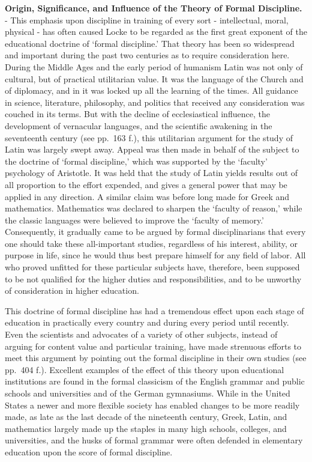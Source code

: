\documentclass[
]{book}
\begin{document}
\textbf{Origin, Significance, and Influence of the Theory of Formal Discipline.} - This emphasis upon discipline in training of every sort - intellectual, moral, physical - has often caused Locke to be regarded as the first great exponent of the educational doctrine of `formal discipline.' That theory has been so widespread and important during the past two centuries as to require consideration here. During the Middle Ages and the early period of humanism Latin was not only of cultural, but of practical utilitarian value. It was the language of the Church and of diplomacy, and in it was locked up all the learning of the times. All guidance in science, literature, philosophy, and politics that received any consideration was couched in its terms. But with the decline of ecclesiastical influence, the development of vernacular languages, and the scientific awakening in the seventeenth century (see pp.~163 f.), this utilitarian argument for the study of Latin was largely swept away. Appeal was then made in behalf of the subject to the doctrine of `formal discipline,' which was supported by the `faculty' psychology of Aristotle. It was held that the study of Latin yields results out of all proportion to the effort expended, and gives a general power that may be applied in any direction. A similar claim was before long made for Greek and mathematics. Mathematics was declared to sharpen the `faculty of reason,' while the classic languages were believed to improve the `faculty of memory.' Consequently, it gradually came to be argued by formal disciplinarians that every one should take these all-important studies, regardless of his interest, ability, or purpose in life, since he would thus best prepare himself for any field of labor. All who proved unfitted for these particular subjects have, therefore, been supposed to be not qualified for the higher duties and responsibilities, and to be unworthy of consideration in higher education.

This doctrine of formal discipline has had a tremendous effect upon each stage of education in practically every country and during every period until recently. Even the scientists and advocates of a variety of other subjects, instead of arguing for content value and particular training, have made strenuous efforts to meet this argument by pointing out the formal discipline in their own studies (see pp.~404 f.). Excellent examples of the effect of this theory upon educational institutions are found in the formal classicism of the English grammar and public schools and universities and of the German gymnasiums. While in the United States a newer and more flexible society has enabled changes to be more readily made, as late as the last decade of the nineteenth century, Greek, Latin, and mathematics largely made up the staples in many high schools, colleges, and universities, and the husks of formal grammar were often defended in elementary education upon the score of formal discipline.
\end{document}
